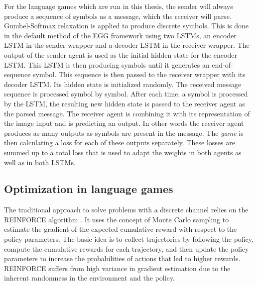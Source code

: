For the language games which are run in this thesis, the sender will always produce a sequence of symbols as a message, which the receiver will parse.
Gumbel-Softmax relaxation is applied to produce discrete symbols.
This is done in the default method of the EGG framework using two LSTMs, an encoder LSTM in the sender wrapper and a decoder LSTM in the receiver wrapper.
The output of the sender agent is used as the initial hidden state for the encoder LSTM.
This LSTM is then producing symbols until it generates an end-of-sequence symbol.
This sequence is then passed to the receiver wrapper with its decoder LSTM.
Its hidden state is initialized randomly.
The received message sequence is processed symbol by symbol.
After each time, a symbol is processed by the LSTM, the resulting new hidden state is passed to the receiver agent as the parsed message.
The receiver agent is combining it with its representation of the image input and is predicting an output.
In other words the receiver agent produces as many outputs as symbols are present in the message.
The \emph{game} is then calculating a loss for each of these outputs separately.
These losses are summed up to a total loss that is used to adapt the weights in both agents as well as in both LSTMs.

\subsection{Optimization in language games}
The traditional approach to solve problems with a discrete channel relies on the REINFORCE algorithm \citep{Williams1992}.
It uses the concept of Monte Carlo sampling to estimate the gradient of the expected cumulative reward with respect to the policy parameters.
The basic idea is to collect trajectories by following the policy, compute the cumulative rewards for each trajectory, and then update the policy parameters to increase the probabilities of actions that led to higher rewards.
REINFORCE suffers from high variance in gradient estimation due to the inherent randomness in the environment and the policy.

